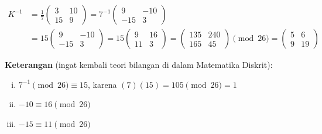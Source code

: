\documentclass{article}
\begin{document}

\begin{align*}
K^{-1} &= \frac{1}{7} \begin{pmatrix} 3 & 10 \\ 15 & 9 \end{pmatrix} = 7^{-1} \begin{pmatrix} 9 & -10 \\ -15 & 3 \end{pmatrix} \\ &= 15 \begin{pmatrix} 9 & -10 \\ -15 & 3 \end{pmatrix} = 15 \begin{pmatrix} 9 & 16 \\ 11 & 3 \end{pmatrix} = \begin{pmatrix} 135 & 240 \\ 165 & 45 \end{pmatrix} \pmod{26} = \begin{pmatrix} 5 & 6 \\ 9 & 19 \end{pmatrix}
\end{align*}

\vspace{10mm}

\textbf{Keterangan} (ingat kembali teori bilangan di dalam Matematika Diskrit):
\begin{enumerate}[(i)]
\item $7^{-1} \pmod{26} \equiv 15$, karena $(7)(15) = 105 \pmod{26} = 1$
\item $-10 \equiv 16 \pmod{26}$
\item $-15 \equiv 11 \pmod{26}$ 
\end{enumerate}
\end{document}
